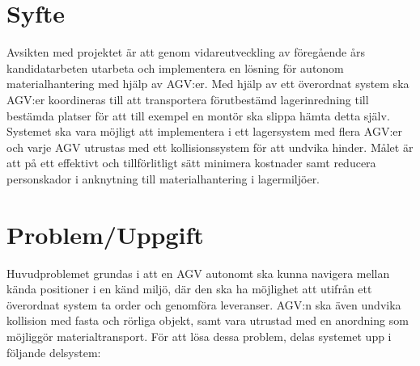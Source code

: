 \documentclass[a4paper,11pt]{article}
\begin{document}
\section{Syfte}
Avsikten med projektet är att genom vidareutveckling av föregående års
kandidatarbeten utarbeta och implementera en lösning för autonom
materialhantering med hjälp av AGV:er. Med hjälp av ett överordnat system
ska AGV:er koordineras till att transportera förutbestämd lagerinredning
till bestämda platser för att till exempel en montör ska slippa hämta detta
själv. Systemet ska vara möjligt att implementera i ett lagersystem med
flera AGV:er och varje AGV utrustas med ett kollisionssystem för att
undvika hinder. Målet är att på ett effektivt och tillförlitligt sätt
minimera kostnader samt reducera personskador i anknytning till
materialhantering i lagermiljöer.


\section{Problem/Uppgift}

Huvudproblemet grundas i att en AGV autonomt ska kunna navigera mellan
kända positioner i en känd miljö, där den ska ha möjlighet att utifrån ett
överordnat system ta order och genomföra leveranser. AGV:n ska även undvika
kollision med fasta och rörliga objekt, samt vara utrustad med en anordning
som möjliggör materialtransport. För att lösa dessa problem, delas systemet
upp i följande delsystem:
\end{document}
